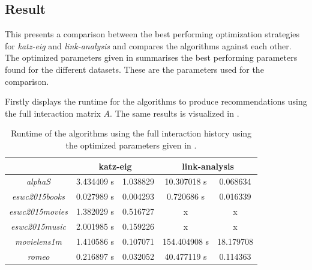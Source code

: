 
\subsection{Result}

This presents a comparison between the best performing optimization strategies for \textit{katz-eig} and \textit{link-analysis} and compares the algorithms against each other. The optimized parameters given in  summarises the best performing parameters found for the different datasets. These are the parameters used for the comparison.

Firstly  displays the runtime for the algorithms to produce recommendations using the full interaction matrix $A$. The same results is visualized in .

\begin{table}[h!]
    \centering
    \begin{tabular}{| c | c | c | c | c |}
        \hline
        \textbf{}               & \multicolumn{2}{c|}{\textbf{katz-eig}} & \multicolumn{2}{c|}{\textbf{link-analysis}} \\ \hline
        \textit{alphaS}         & 3.434409 s & 1.038829 & 10.307018 s  & 0.068634       \\ \hline
        \textit{eswc2015books}  & 0.027989 s & 0.004293 & 0.720686 s   & 0.016339       \\ \hline
        \textit{eswc2015movies} & 1.382029 s & 0.516727 & x            & x              \\ \hline
        \textit{eswc2015music}  & 2.001985 s & 0.159226 & x            & x              \\ \hline
        \textit{movielens1m}    & 1.410586 s & 0.107071 & 154.404908 s & 18.179708      \\ \hline
        \textit{romeo}          & 0.216897 s & 0.032052 & 40.477119 s  & 0.114363       \\ \hline
    \end{tabular}
    \caption{Runtime of the algorithms using the full interaction history using the optimized parameters given in .}
    \label{tab:alg_full_time}
\end{table}

